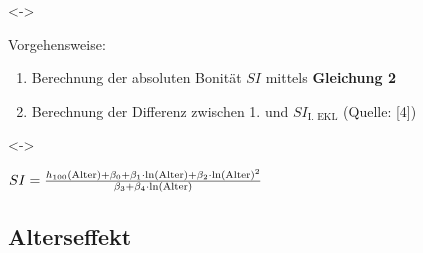 \begin{frame}[c]
  \visible<\theFirstElement->{Vorgehensweise:
  \begin{enumerate}
  \item Berechnung der absoluten Bonität \(SI\) mittels \textbf{Gleichung 2}
  \item Berechnung der Differenz zwischen 1. und \(SI_{\text{I. EKL}}\) (Quelle: [4])
  \end{enumerate}}

  \visible<\theFirstElement->{\begin{center}
      \begin{minipage}{0.5\linewidth}
        \centerline{\(SI = \frac{h_{100}(\text{Alter}) + \beta_0 + \beta_1 \cdot \ln(\text{Alter}) + \beta_2 \cdot \ln(\text{Alter})^2 }{\beta_3 + \beta_4 \cdot \ln(\text{Alter})}{}\)}
        \vspace{\captiondistance}
      \end{minipage}
    \end{center}}

\end{frame}

\subsection{Alterseffekt}

